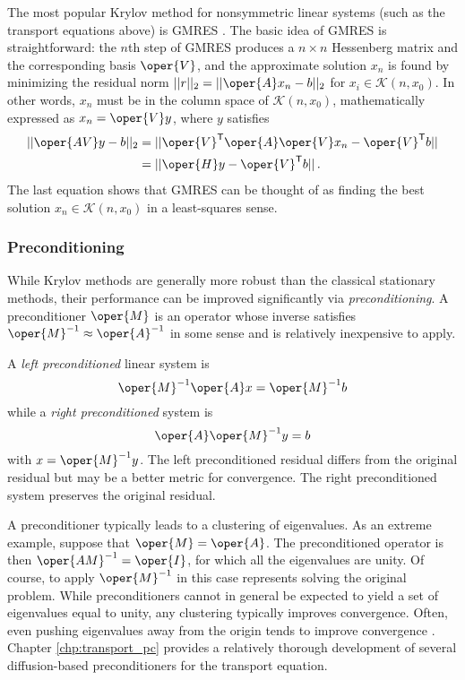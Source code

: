 The most popular Krylov method for nonsymmetric linear systems (such as the 
transport equations above) is GMRES \cite{saad1986gmr}.  The basic idea 
of GMRES is straightforward:  the $n$th step of GMRES produces a 
$n\times n$ Hessenberg matrix and the corresponding basis $\oper{V}$,
and the approximate solution $x_n$ is found by minimizing the residual 
norm $||r||_2 = ||\oper{A}x_n-b||_2$
for $x_i \in \mathcal{K}(n, x_0)$.  In other words, $x_n$ must be in 
the column space of $\mathcal{K}(n, x_0)$, mathematically 
expressed as $x_n = \oper{V} y$,  where 
$y$ satisfies 
\begin{equation}
\begin{split}
  ||\oper{AV}y-b||_2 &= ||\oper{V}^{\transp} \oper{A} \oper{V} x_n -\oper{V}^{\transp} b|| \\
                     &= || \oper{H} y - \oper{V}^{\transp} b || \, .
\end{split}
\end{equation}
The last equation shows that GMRES can be thought of as finding the 
best solution $x_n \in \mathcal{K}(n, x_0)$ in a least-squares sense.

\subsubsection{Preconditioning}

While Krylov methods are generally more robust than the classical 
stationary methods, their performance can be improved significantly
via \emph{preconditioning}.  A preconditioner $\oper{M}$ is an operator 
whose inverse satisfies $\oper{M}^{-1} \approx \oper{A}^{-1}$ in some sense 
and is relatively inexpensive to apply.

A \emph{left preconditioned} linear system is
\begin{equation}
  \oper{M}^{-1}\oper{A}x = \oper{M}^{-1}b
\end{equation}
while a \emph{right preconditioned} system is 
\begin{equation}
  \oper{A}\oper{M}^{-1} y = b
\end{equation}
with $x = \oper{M}^{-1} y$.  The left preconditioned residual differs 
from the original residual but may be a better metric for convergence. 
The right preconditioned system preserves the original residual.  

A preconditioner typically leads to a clustering of eigenvalues.  As 
an extreme example, suppose that $\oper{M} = \oper{A}$.  The 
preconditioned operator is then $\oper{AM}^{-1} = \oper{I}$, for 
which all the eigenvalues are unity.  Of course, to apply $\oper{M}^{-1}$ 
in this case represents solving the original problem.  While preconditioners
cannot in general be expected to yield a set of eigenvalues equal to unity, 
any clustering typically improves convergence.  Often, even pushing 
eigenvalues away from the origin tends to improve 
convergence \cite{larsen2010ado}.
Chapter \ref{chp:transport_pc} provides a relatively thorough 
development of several diffusion-based preconditioners for the 
transport equation.

